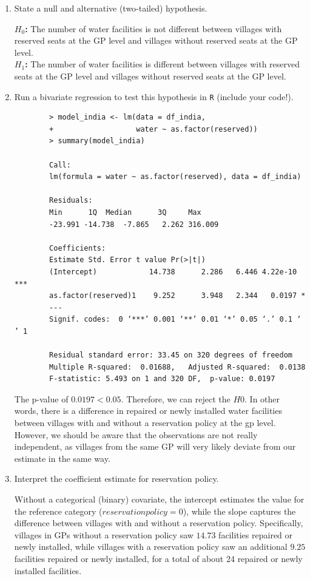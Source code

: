\documentclass[12pt,letterpaper]{article}
\begin{document}
\newpage
\begin{enumerate}
	\item [(a)] State a null and alternative (two-tailed) hypothesis. 
	
	\begin{center}
		\textbf{$H_0$:} The number of water facilities is not different between villages with reserved seats at the GP level and villages without reserved seats at the GP level.\\[1em]
		\textbf{$H_1$:} The number of water facilities is different between villages with reserved seats at the GP level and villages without reserved seats at the GP level.
	\end{center}
	
	
	\vspace{6cm}
	\item [(b)] Run a bivariate regression to test this hypothesis in \texttt{R} (include your code!).
	
	\begin{verbatim}
		> model_india <- lm(data = df_india,
		+                   water ~ as.factor(reserved))
		> summary(model_india)
		
		Call:
		lm(formula = water ~ as.factor(reserved), data = df_india)
		
		Residuals:
		Min      1Q  Median      3Q     Max 
		-23.991 -14.738  -7.865   2.262 316.009 
		
		Coefficients:
		Estimate Std. Error t value Pr(>|t|)    
		(Intercept)            14.738      2.286   6.446 4.22e-10 ***
		as.factor(reserved)1    9.252      3.948   2.344   0.0197 *  
		---
		Signif. codes:  0 ‘***’ 0.001 ‘**’ 0.01 ‘*’ 0.05 ‘.’ 0.1 ‘ ’ 1
		
		Residual standard error: 33.45 on 320 degrees of freedom
		Multiple R-squared:  0.01688,	Adjusted R-squared:  0.0138 
		F-statistic: 5.493 on 1 and 320 DF,  p-value: 0.0197
	\end{verbatim}
	
	The p-value of $0.0197 < 0.05$. Therefore, we can reject the $H0$. In other words, there is a difference in repaired or newly installed water facilities between villages with and without a reservation policy at the gp level.
	However, we should be aware that the observations are not really independent, as villages from the same GP will very likely deviate from our estimate in the same way.
	
	\item [(c)] Interpret the coefficient estimate for reservation policy. 
	
	Without a categorical (binary) covariate, the intercept estimates the value for the reference category ($reservation policy = 0$), while the slope captures the difference between villages with and without a reservation policy.
	Specifically, villages in GPs without a reservation policy saw $14.73$ facilities repaired or newly installed, while villages with a reservation policy saw an additional $9.25$ facilities repaired or newly installed, for a total of about 24 repaired or newly installed facilities.
	
	
\end{enumerate}


\end{document}
